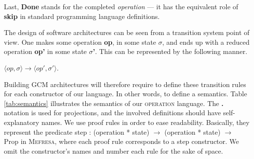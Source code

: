 		
	
	
		Last, \textbf{Done} stands for the completed \textit{operation} --- it has 
	the equivalent role of \textbf{skip} in standard programming language definitions.
	
	
		The design of software architectures can be seen from a transition system point of view.	One makes some
	\textsf{operation} \textbf{op}, in some state \textbf{$\sigma$}, and ends up with a reduced
	\textsf{operation} \textbf{op'} in some state \textbf{$\sigma$'}. This can be represented by the following manner.
	
	\begin{center}
		$\langle op, \sigma \rangle \longrightarrow \langle op', \sigma' \rangle$. 
	\end{center}
	
	\noindent Building \ac{GCM} architectures will therefore require to define these transition rules for each
	constructor of our language. In other words, to define a semantics.	Table \ref{tab:semantics} illustrates
	the semantics of our \textsc{operation} language. The \textbf{.} notation is used for projections, and
	the involved definitions should have self-explanatory names.
	We use proof rules in order to ease readability. Basically, they represent the predicate	
	\textsf{step : (operation * state) $\rightarrow$ (operation * state) $\rightarrow$ Prop} in \textsc{Mefresa}, where
	each proof rule corresponds to a \textsf{step} constructor. We omit the constructor's names and number each
	rule for the sake of space.
	

